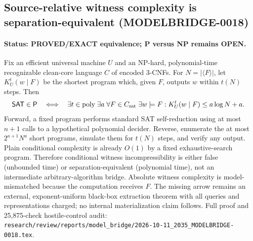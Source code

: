 \subsection{Source-relative witness complexity is separation-equivalent (MODELBRIDGE-0018)}
\label{subsec:modelbridge0018}
\paragraph{Status: PROVED/EXACT equivalence; P versus NP remains OPEN.}
Fix an efficient universal machine $U$ and an NP-hard, polynomial-time recognizable clean-core language $C$ of encoded $3$-CNFs.  For $N=|\langle F\rangle|$, let $K_U^t(w\mid F)$ be the shortest program which, given $F$, outputs $w$ within $t(N)$ steps.  Then
\[
\mathsf{SAT}\in\mathsf P
\quad\Longleftrightarrow\quad
\exists t\in\mathrm{poly}\;\exists a\;\forall F\in C_{\rm sat}\;\exists w\models F:
K_U^t(w\mid F)\le a\log N+a.
\]
Forward, a fixed program performs standard SAT self-reduction using at most $n+1$ calls to a hypothetical polynomial decider.  Reverse, enumerate the at most $2^{a+1}N^a$ short programs, simulate them for $t(N)$ steps, and verify any output.  Plain conditional complexity is already $O(1)$ by a fixed exhaustive-search program.  Therefore conditional witness incompressibility is either false (unbounded time) or separation-equivalent (polynomial time), not an intermediate arbitrary-algorithm bridge.  Absolute witness complexity is model-mismatched because the computation receives $F$.  The missing arrow remains an external, exponent-uniform black-box extraction theorem with all queries and representations charged; no internal materialization claim follows.  Full proof and 25,875-check hostile-control audit: \texttt{research/review/reports/model\_bridge/2026-10-11\_2035\_MODELBRIDGE-0018.tex}.
